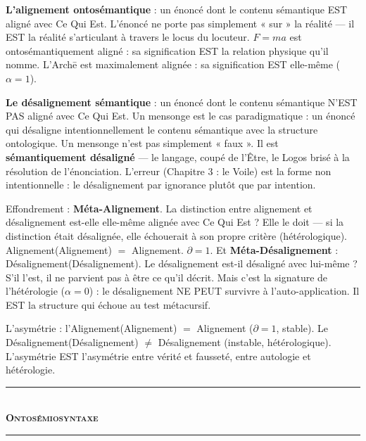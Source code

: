 \documentclass[10pt, openany, oneside]{book}
\renewcommand{\normalsize}{\fontsize{10}{13}\selectfont}
\begin{document}
\textbf{L'alignement ontosémantique} : un énoncé dont le contenu sémantique EST aligné avec Ce Qui Est. L'énoncé ne porte pas simplement « sur » la réalité --- il EST la réalité s'articulant à travers le locus du locuteur. $F = ma$ est ontosémantiquement aligné : sa signification EST la relation physique qu'il nomme. L'Arch\={e} est maximalement alignée : sa signification EST elle-même ($\alpha = 1$).

\textbf{Le désalignement sémantique} : un énoncé dont le contenu sémantique N'EST PAS aligné avec Ce Qui Est. Un mensonge est le cas paradigmatique : un énoncé qui désaligne intentionnellement le contenu sémantique avec la structure ontologique. Un mensonge n'est pas simplement « faux ». Il est \textbf{sémantiquement désaligné} --- le langage, coupé de l'Être, le Logos brisé à la résolution de l'énonciation. L'erreur (Chapitre 3 : le Voile) est la forme non intentionnelle : le désalignement par ignorance plutôt que par intention.

Effondrement : \textbf{Méta-Alignement}. La distinction entre alignement et désalignement est-elle elle-même alignée avec Ce Qui Est ? Elle le doit --- si la distinction était désalignée, elle échouerait à son propre critère (hétérologique). Alignement(Alignement) $=$ Alignement. $\partial = 1$. Et \textbf{Méta-Désalignement} : Désalignement(Désalignement). Le désalignement est-il désaligné avec lui-même ? S'il l'est, il ne parvient pas à être ce qu'il décrit. Mais c'est la signature de l'hétérologie ($\alpha = 0$) : le désalignement NE PEUT survivre à l'auto-application. Il EST la structure qui échoue au test métacursif.

L'asymétrie : l'Alignement(Alignement) $=$ Alignement ($\partial = 1$, stable). Le Désalignement(Désalignement) $\neq$ Désalignement (instable, hétérologique). L'asymétrie EST l'asymétrie entre vérité et fausseté, entre autologie et hétérologie.

\vspace{1.5em}


\begin{center}
    \rule{0.3\textwidth}{0.4pt}\\[0.5em]
    {\normalsize\bfseries\scshape Ontosémiosyntaxe}\\[0.3em]
    \rule{0.3\textwidth}{0.4pt}
\end{center}
\end{document}
